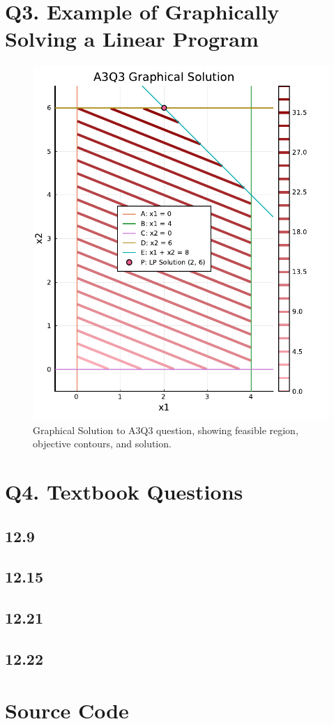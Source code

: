 \documentclass{article}
\begin{document}
    \section{Q3. Example of Graphically Solving a Linear Program}

    \begin{figure}[H]
        \centering
        \includegraphics[width=0.5\linewidth]{A3Q3_Plot.pdf}
        \caption{Graphical Solution to A3Q3 question, showing feasible region, objective contours, and solution.}
        \label{fig:A3Q3_GraphicalSolution}
    \end{figure}

    \section{Q4. Textbook Questions}

    \subsection{12.9}

    \subsection{12.15}

    \subsection{12.21}

    \subsection{12.22}


    \newpage
    \appendix

    \section{Source Code}
\end{document}
